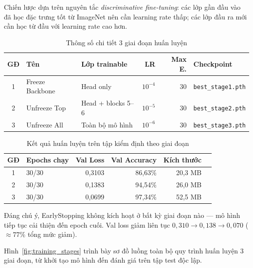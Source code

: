 Chiến lược dựa trên nguyên tắc \textit{discriminative fine-tuning}: các lớp gần đầu vào đã học đặc trưng tốt từ ImageNet nên cần learning rate thấp; các lớp đầu ra mới cần học từ đầu với learning rate cao hơn.

\begin{table}[H]
  \centering
  \caption{Thông số chi tiết 3 giai đoạn huấn luyện}
  \label{tab:stages}
  \begin{tabularx}{\linewidth}{clXrrl}
    \toprule
    \textbf{GĐ} & \textbf{Tên} & \textbf{Lớp trainable} & \textbf{LR} & \textbf{Max E.} & \textbf{Checkpoint} \\
    \midrule
    1 & Freeze Backbone   & Head only                   & $10^{-4}$ & 30 & \texttt{best\_stage1.pth} \\
    2 & Unfreeze Top      & Head + blocks 5--6          & $10^{-5}$ & 30 & \texttt{best\_stage2.pth} \\
    3 & Unfreeze All      & Toàn bộ mô hình             & $10^{-6}$ & 30 & \texttt{best\_stage3.pth} \\
    \bottomrule
  \end{tabularx}
\end{table}

\begin{table}[H]
  \centering
  \caption{Kết quả huấn luyện trên tập kiểm định theo giai đoạn}
  \label{tab:train_results}
  \begin{tabular}{clrrrl}
    \toprule
    \textbf{GĐ} & \textbf{Epochs chạy} & \textbf{Val Loss} & \textbf{Val Accuracy} & \textbf{Kích thước} \\
    \midrule
    1 & 30/30 & 0,3103 & 86,63\% & 20,3 MB \\
    2 & 30/30 & 0,1383 & 94,54\% & 26,0 MB \\
    3 & 30/30 & 0,0699 & 97,34\% & 52,5 MB \\
    \bottomrule
  \end{tabular}
\end{table}

Đáng chú ý, EarlyStopping không kích hoạt ở bất kỳ giai đoạn nào --- mô hình tiếp tục cải thiện đến epoch cuối. Val loss giảm liên tục $0{,}310 \to 0{,}138 \to 0{,}070$ ($\approx 77\%$ tổng mức giảm).

Hình~\ref{fig:training_stages} trình bày sơ đồ luồng toàn bộ quy trình huấn luyện 3 giai đoạn, từ khởi tạo mô hình đến đánh giá trên tập test độc lập.

